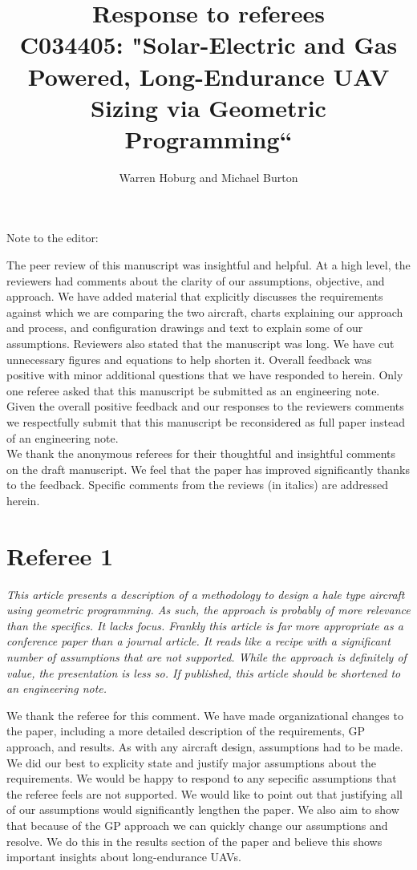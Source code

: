 \documentclass[10pt, a4paper]{article}
\begin{document}
\title{Response to referees \\
C034405: "Solar-Electric and Gas Powered, Long-Endurance UAV Sizing via Geometric Programming``}
\author{Warren Hoburg and Michael Burton}
\maketitle

Note to the editor:

The peer review of this manuscript was insightful and helpful. At a high level, the reviewers had comments about the clarity of our assumptions, objective, and approach.  We have added material that explicitly discusses the requirements against which we are comparing the two aircraft, charts explaining our approach and process, and configuration drawings and text to explain some of our assumptions.  Reviewers also stated that the manuscript was long.  We have cut unnecessary figures and equations to help shorten it.  Overall feedback was positive with minor additional questions that we have responded to herein.  Only one referee asked that this manuscript be submitted as an engineering note.  Given the overall positive feedback and our responses to the reviewers comments we respectfully submit that this manuscript be reconsidered as full paper instead of an engineering note. \\

We thank the anonymous referees for their thoughtful and insightful comments on the draft manuscript.
We feel that the paper has improved significantly thanks to the feedback. 
Specific comments from the reviews (in italics) are addressed herein.

\section*{Referee 1}

\emph{
This article presents a description of a methodology to design a hale type aircraft using geometric programming.
As such, the approach is probably of more relevance than the specifics.
It lacks focus. Frankly this article is far more appropriate as a conference paper than a journal article. It reads like a recipe with a significant number of assumptions that are not supported.
While the approach is definitely of value, the presentation is less so. If published, this article should be shortened to an engineering note. }

We thank the referee for this comment. 
We have made organizational changes to the paper, including a more detailed description of the requirements, GP approach, and results. 
As with any aircraft design, assumptions had to be made.  
We did our best to explicity state and justify major assumptions about the requirements.   
We would be happy to respond to any sepecific assumptions that the referee feels are not supported. 
We would like to point out that justifying all of our assumptions would significantly lengthen the paper.
We also aim to show that because of the GP approach we can quickly change our assumptions and resolve. 
We do this in the results section of the paper and believe this shows important insights about long-endurance UAVs.  \\
\end{document}
